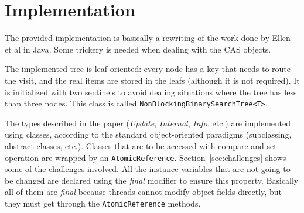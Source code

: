 \documentclass[a4paper,12pt]{article}
\begin{document}
\section{Implementation}
The provided implementation is basically a rewriting of the work done by Ellen et al in Java.
Some trickery is needed when dealing with the \ac{CAS} objects.

The implemented tree is leaf-oriented: every node has a key that needs to route the visit, and the real items are stored in the leafs (although it is not required).
It is initialized with two sentinels to avoid dealing situations where the tree has less than three nodes.
This class is called \texttt{Non\-Blocking\-Binary\-Search\-Tree\-<T>}.

The types described in the paper (\emph{Update}, \emph{Internal}, \emph{Info}, etc.) are implemented using classes, according to the standard object-oriented paradigms (subclassing, abstract classes, etc.). Classes that are to be accessed with compare-and-set operation are wrapped by an \texttt{AtomicReference}.
Section~\ref{sec:challenges} shows some of the challenges involved.
All the instance variables that are not going to be changed are declared using the \emph{final} modifier to ensure this property.
Basically all of them are \emph{final} because threads cannot modify object fields directly, but they must get through the \texttt{AtomicReference} methods.
\end{document}
